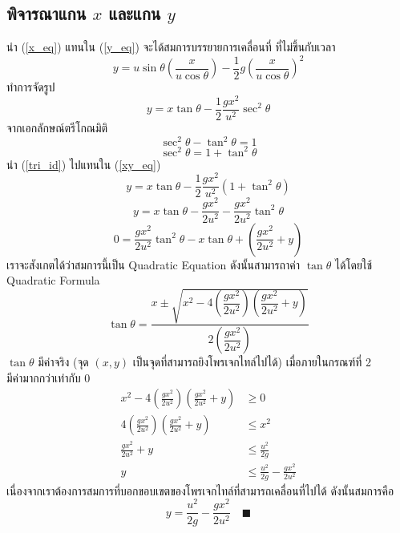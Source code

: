 \documentclass[a4paper,12pt]{article}
\begin{document}
	\subsection{พิจารณาแกน $x$ และแกน $y$}
	นำ (\ref{x_eq}) แทนใน (\ref{y_eq}) จะได้สมการบรรยายการเคลื่อนที่ ที่ไม่ขึ้นกับเวลา
	$$y=u\sin\theta (\frac{x}{u\cos\theta})-\frac{1}{2}g(\frac{x}{u\cos\theta})^2$$
	ทำการจัดรูป
	\begin{equation}\label{xy_eq}
	y=x\tan\theta-\frac{1}{2}\frac{gx^2}{u^2}\sec^2\theta
	\end{equation}
	จากเอกลักษณ์ตรีโกณมิติ
	$$\sec^2\theta-\tan^2\theta=1$$
	\begin{equation}\label{tri_id}
	\sec^2\theta=1+\tan^2\theta
	\end{equation}
	นำ (\ref{tri_id}) ไปแทนใน (\ref{xy_eq})
	$$y=x\tan\theta-\frac{1}{2}\frac{gx^2}{u^2}(1+\tan^2\theta)$$
	$$y=x\tan\theta-\frac{gx^2}{2u^2}-\frac{gx^2}{2u^2}\tan^2\theta$$
	$$0=\frac{gx^2}{2u^2}\tan^2\theta-x\tan\theta+(\frac{gx^2}{2u^2}+y)$$
	เราจะสังเกตได้ว่าสมการนี้เป็น Quadratic Equation ดังนั้นสามารถาค่า $\tan\theta$ ได้โดยใช้ Quadratic Formula
	$$\tan\theta = \dfrac{x\pm\sqrt{x^2-4\left(\dfrac{gx^2}{2u^2}\right)\left(\dfrac{gx^2}{2u^2}+y\right)}}{2\left(\dfrac{gx^2}{2u^2}\right)}$$
	$\tan\theta$ มีค่าจริง (จุด $(x,y)$ เป็นจุดที่สามารถยิงโพรเจกไทล์ไปได้) เมื่อภายในกรณฑ์ที่ 2\\ มีค่ามากกว่าเท่ากับ 0
	\begin{align*}
	x^2-4\left(\frac{gx^2}{2u^2}\right)\left(\frac{gx^2}{2u^2}+y\right)&\geqslant 0\\
	4\left(\frac{gx^2}{2u^2}\right)\left(\frac{gx^2}{2u^2}+y\right)&\leqslant x^2\\
	\frac{gx^2}{2u^2}+y&\leqslant \frac{u^2}{2g}\\
	y&\leqslant \frac{u^2}{2g}-\frac{gx^2}{2u^2}
	\end{align*}
	เนื่องจากเราต้องการสมการที่บอกขอบเขตของโพรเจกไทล์ที่สามารถเคลื่อนที่ไปได้ ดังนั้นสมการคือ
	\begin{equation}\label{pos}
	y= \frac{u^2}{2g}-\frac{gx^2}{2u^2}\quad\blacksquare
	\end{equation}
\end{document}
